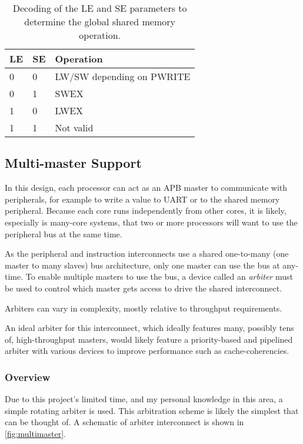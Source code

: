 \begin{table}
\centering
\begin{tabular}{|l|l|l|} 
\hline
LE & SE & Operation                  \\ 
\hline
0  & 0  & LW/SW depending on PWRITE  \\ 
\hline
0  & 1  & SWEX                       \\ 
\hline
1  & 0  & LWEX                       \\ 
\hline
1  & 1  & Not valid                  \\
\hline
\end{tabular}
\caption{Decoding of the LE and SE parameters to determine the global shared memory operation.}
\label{tab:vapb}
\end{table}

\subsection{Multi-master Support}
\label{sec:multimaster}
In this design, each processor can act as an APB master to communicate with peripherals, for example to write a value to UART or to the shared memory peripheral. Because each core runs independently from other cores, it is likely, especially is many-core systems, that two or more processors will want to use the peripheral bus at the same time.

As the peripheral and instruction interconnects use a shared one-to-many (one master to many slaves) bus architecture, only one master can use the bus at any-time. To enable multiple masters to use the bus, a device called an \textit{arbiter} must be used to control which master gets access to drive the shared interconnect.

Arbiters can vary in complexity, mostly relative to throughput requirements.

An ideal arbiter for this interconnect, which ideally features many, possibly tens of, high-throughput masters, would likely feature a priority-based and pipelined arbiter with various devices to improve performance such as cache-coherencies. 

\subsubsection{Overview}
Due to this project's limited time, and my personal knowledge in this area, a simple rotating arbiter is used. This arbitration scheme is likely the simplest that can be thought of.  A schematic of arbiter interconnect is shown in \cref{fig:multimaster}.

